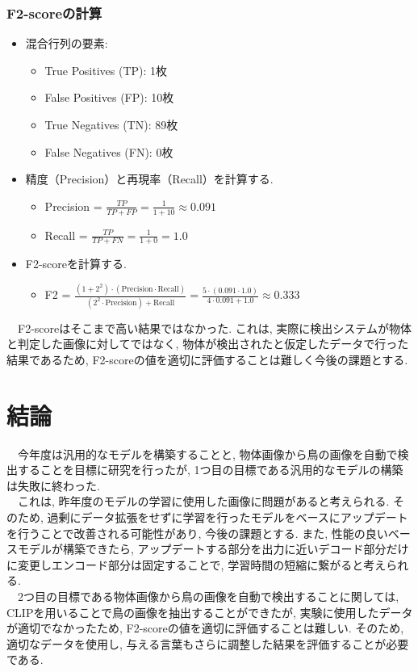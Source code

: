 \documentclass[a4paper, 12pt]{report}
\begin{document}
\subsubsection{F2-scoreの計算}
\begin{itemize}
    \item 混合行列の要素:
        \begin{itemize}
            \item True Positives (TP): 1枚
            \item False Positives (FP): 10枚
            \item True Negatives (TN): 89枚
            \item False Negatives (FN): 0枚
        \end{itemize}
    \item 精度（Precision）と再現率（Recall）を計算する. 
        \begin{itemize}
            \item Precision = \(\frac{TP}{TP + FP} = \frac{1}{1 + 10} \approx 0.091\)
            \item Recall = \(\frac{TP}{TP + FN} = \frac{1}{1 + 0} = 1.0\)
        \end{itemize}
    \item F2-scoreを計算する. 
        \begin{itemize}
            \item F2 = \(\frac{(1 + 2^2) \cdot (\text{Precision} \cdot \text{Recall})}{(2^2 \cdot \text{Precision}) + \text{Recall}} = \frac{5 \cdot (0.091 \cdot 1.0)}{4 \cdot 0.091 + 1.0} \approx 0.333\)
        \end{itemize}
\end{itemize}
　F2-scoreはそこまで高い結果ではなかった. 
これは, 実際に検出システムが物体と判定した画像に対してではなく, 物体が検出されたと仮定したデータで行った結果であるため, F2-scoreの値を適切に評価することは難しく今後の課題とする. 

\section{結論}
　今年度は汎用的なモデルを構築することと, 物体画像から鳥の画像を自動で検出することを目標に研究を行ったが, 1つ目の目標である汎用的なモデルの構築は失敗に終わった. 
\\　これは, 昨年度のモデルの学習に使用した画像に問題があると考えられる. そのため, 過剰にデータ拡張をせずに学習を行ったモデルをベースにアップデートを行うことで改善される可能性があり, 今後の課題とする. また, 性能の良いベースモデルが構築できたら, アップデートする部分を出力に近いデコード部分だけに変更しエンコード部分は固定することで, 学習時間の短縮に繋がると考えられる. 
\\　2つ目の目標である物体画像から鳥の画像を自動で検出することに関しては, CLIPを用いることで鳥の画像を抽出することができたが, 実験に使用したデータが適切でなかったため, F2-scoreの値を適切に評価することは難しい. そのため, 適切なデータを使用し, 与える言葉もさらに調整した結果を評価することが必要である. 
\end{document}
